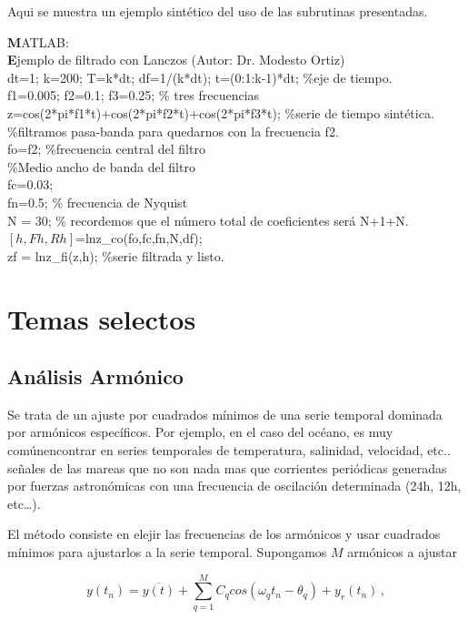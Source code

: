 \documentclass[
]{agujournal2019}
\begin{document}
Aqui se muestra un ejemplo sintético del uso de las subrutinas
presentadas.

\begin{framed}
{\noindent \textbf MATLAB:}\\
{\textbf Ejemplo de filtrado con Lanczos (Autor: Dr. Modesto Ortiz)}\\
{\noindent}dt=1; k=200; T=k*dt; df=1/(k*dt); t=(0:1:k-1)*dt; \%eje de tiempo.\\
f1=0.005; f2=0.1; f3=0.25; \% tres frecuencias\\
z=cos(2*pi*f1*t)+cos(2*pi*f2*t)+cos(2*pi*f3*t); \%serie de tiempo sintética.
\\
\%filtramos pasa-banda para quedarnos con la frecuencia f2. \\
fo=f2; \%frecuencia central del filtro\\
\%Medio ancho de banda del filtro \\
fc=0.03;\\
fn=0.5; \% frecuencia de Nyquist\\
N = 30; \% recordemos que el número total de coeficientes será N+1+N. \\
$[{ h},{ Fh},{ Rh}]$=lnz\_co(fo,fc,fn,N,df);\\
zf = lnz\_fi(z,h); \%serie filtrada y listo.
\end{framed}

\section{Temas selectos}\label{temas-selectos}

\subsection{Análisis Armónico}\label{anuxe1lisis-armuxf3nico}

Se trata de un ajuste por cuadrados mínimos de una serie temporal
dominada por armónicos específicos. Por ejemplo, en el caso del océano,
es muy comúnencontrar en series temporales de temperatura, salinidad,
velocidad, etc.. señales de las mareas que no son nada mas que
corrientes periódicas generadas por fuerzas astronómicas con una
frecuencia de oscilación determinada (24h, 12h, etc\ldots).

El método consiste en elejir las frecuencias de los armónicos y usar
cuadrados mínimos para ajustarlos a la serie temporal. Supongamos \(M\)
armónicos a ajustar

\[y(t_n) = \overline{y(t)} + \sum\limits^{M}_{q=1}C_q cos(\omega_q t_n -\theta_q)+y_r(t_n)\,,\]
\end{document}
